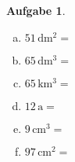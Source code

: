 \documentclass[12pt,fleqn]{article}
\theoremstyle{aufg}
\newtheorem{aufgabe}{Aufgabe}
\theoremstyle{bsp}
\begin{document}
\begin{flushleft}
\begin{aufgabe}
\begin{multicols}{3} 
\begin{enumerate}[a)] 
\item 
$51\,\mathrm{dm^2}=$
\item 
$65\,\mathrm{dm^3}=$
\item 
$65\,\mathrm{km^3}=$
\item 
$12\,\mathrm{a}=$
\item 
$9\,\mathrm{cm^3}=$
\item 
$97\,\mathrm{cm^2}=$
\end{enumerate} 
\end{multicols} 
\end{aufgabe} 
\end{flushleft} 
\end{document}
